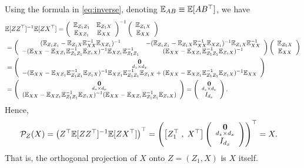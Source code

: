 \documentclass[11pt, A4paper, openany, uplatex]{book}
\begin{document}
Using the formula in \eqref{eq:inverse}, denoting $\mathbb{E}_{AB} \equiv \mathbb{E}[A B^\top] $, we have
\small\begin{align}\label{eq:ZX}
\begin{split}
\E[ZZ^\tr]^{-1}\E[ZX^\tr] 
	& = \left(\begin{array}{cc}
		\E_{Z_1 Z_1} & \E_{Z_1 X} \\
		\E_{X Z_1} & \E_{X X} 
		\end{array}	\right)^{-1}
	\left( \begin{array}{c}
		\E_{Z_1 X} \\
		\E_{X X} 
	\end{array}	\right) \\
	& \hspace{-80pt}= \left(\begin{array}{cc}
		(\E_{Z_1 Z_1}  - \E_{Z_1 X} \E_{X X} ^{-1}\E_{X Z_1} )^{-1} & -(\E_{Z_1 Z_1}  - \E_{Z_1 X} \E_{X X}^{-1} \E_{X Z_1} )^{-1} \E_{Z_1 X} \E_{X X}^{-1} \\
		-(\E_{X X}  - \E_{X Z_1} \E_{Z_1 Z_1}^{-1} \E_{Z_1 X} )^{-1} \E_{X Z_1} \E_{Z_1 Z_1}^{-1}  & (\E_{X X} - \E_{X Z_1} \E_{Z_1 Z_1}^{-1} \E_{Z_1 X} )^{-1}
	\end{array} \right)
	\left( \begin{array}{c}
		\E_{Z_1 X} \\
		\E_{X X} 
	\end{array}	\right)\\
	& \hspace{-80pt}= 
	\left(\begin{array}{c}
	\underset{d_z \times d_x}{\mbf{0}} \\
	-(\E_{X X}  - \E_{X Z_1} \E_{Z_1 Z_1}^{-1} \E_{Z_1 X} )^{-1} \E_{X Z_1} \E_{Z_1 Z_1}^{-1} \E_{Z_1 X} + (\E_{X X} - \E_{X Z_1} \E_{Z_1 Z_1}^{-1} \E_{Z_1 X} )^{-1} \E_{XX}
	\end{array} \right) \\
	& \hspace{-80pt}= 
	\left(\begin{array}{c}
	\underset{d_z \times d_x}{\mbf{0}} \\
	(\E_{X X}  - \E_{X Z_1} \E_{Z_1 Z_1}^{-1} \E_{Z_1 X} )^{-1} (\E_{X X} - \E_{X Z_1} \E_{Z_1 Z_1}^{-1} \E_{Z_1 X} )
	\end{array} \right)
	= 
	\left(\begin{array}{c}
	\underset{d_z \times d_x}{\mbf{0}} \\
	I_{d_x}
	\end{array} \right).
\end{split}
\end{align}\normalsize
Hence,
\begin{align*}
	\mathcal{P}_Z(X)
	& = \left( Z^\top \mathbb{E}[ZZ^\top]^{-1} \mathbb{E}[ZX^\top] \right)^\top  = \left( \left[ Z^\top_1 \; , \; X^\top \right] \left(\begin{array}{c}
	\underset{d_z \times d_x}{\mathbf{0}} \\
	I_{d_x}
	\end{array} \right) \right)^\top = X.
\end{align*}
That is, the orthogonal projection of $X$ onto $Z = (Z_1, X)$ is $X$ itself.
\end{document}
